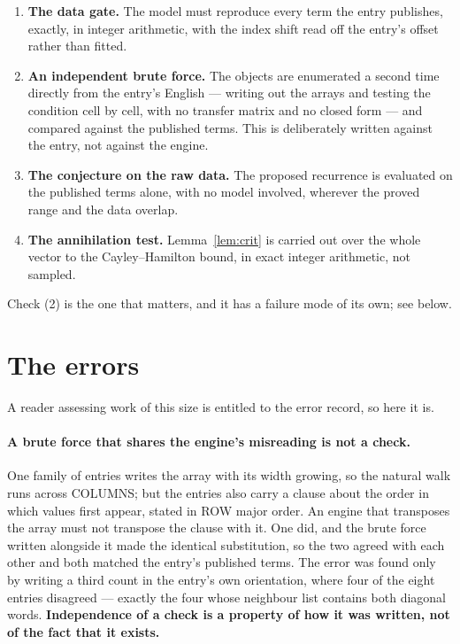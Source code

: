 \documentclass[11pt,a4paper]{article}
\theoremstyle{plain}
\theoremstyle{definition}
\begin{document}
\begin{enumerate}
\item \textbf{The data gate.} The model must reproduce every term the entry publishes, exactly,
in integer arithmetic, with the index shift read off the entry's offset rather than fitted.
\item \textbf{An independent brute force.} The objects are enumerated a second time directly
from the entry's English --- writing out the arrays and testing the condition cell by cell,
with no transfer matrix and no closed form --- and compared against the published terms. This
is deliberately written against the entry, not against the engine.
\item \textbf{The conjecture on the raw data.} The proposed recurrence is evaluated on the
published terms alone, with no model involved, wherever the proved range and the data overlap.
\item \textbf{The annihilation test.} Lemma~\ref{lem:crit} is carried out over the whole vector
to the Cayley--Hamilton bound, in exact integer arithmetic, not sampled.
\end{enumerate}

Check (2) is the one that matters, and it has a failure mode of its own; see below.

\section{The errors}

A reader assessing work of this size is entitled to the error record, so here it is.

\paragraph{A brute force that shares the engine's misreading is not a check.}
One family of entries writes the array with its width growing, so the natural walk runs across
COLUMNS; but the entries also carry a clause about the order in which values first appear,
stated in ROW major order. An engine that transposes the array must not transpose the clause
with it. One did, and the brute force written alongside it made the identical substitution, so
the two agreed with each other and both matched the entry's published terms. The error was
found only by writing a third count in the entry's own orientation, where four of the eight
entries disagreed --- exactly the four whose neighbour list contains both diagonal words.
\textbf{Independence of a check is a property of how it was written, not of the fact that it
exists.}
\end{document}
